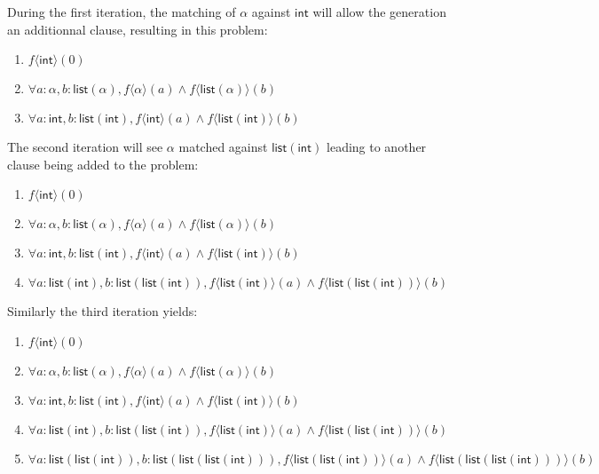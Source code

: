 \documentclass[]{ceurart}
\newcommand\ty[1]{\textsf{#1}}
\begin{document}
During the first iteration, the matching of \(\alpha\) against \(\ty{int}\) will allow the generation an additionnal clause, resulting in this problem:

\begin{enumerate}
   \item \(f\langle \ty{int}\rangle(0)\)
   \item \(\forall a: \alpha, b:\ty{list}(\alpha), f\langle\alpha\rangle(a) \land f\langle \ty{list}(\alpha)\rangle(b)\)
   \item \(\forall a: \ty{int}, b:\ty{list}(\ty{int}), f\langle\ty{int}\rangle(a) \land f\langle \ty{list}(\ty{int})\rangle(b)\)
\end{enumerate}

The second iteration will see \(\alpha\) matched against \(\ty{list}(\ty{int})\) leading to another clause being added to the problem:

\begin{enumerate}
   \item \(f\langle \ty{int}\rangle(0)\)
   \item \(\forall a: \alpha, b:\ty{list}(\alpha), f\langle\alpha\rangle(a) \land f\langle \ty{list}(\alpha)\rangle(b)\)
   \item \(\forall a: \ty{int}, b:\ty{list}(\ty{int}), f\langle\ty{int}\rangle(a) \land f\langle \ty{list}(\ty{int})\rangle(b)\)
   \item \(\forall a: \ty{list}(\ty{int}), b:\ty{list}(\ty{list}(\ty{int})), f\langle\ty{list}(\ty{int})\rangle(a) \land f\langle \ty{list}(\ty{list}(\ty{int}))\rangle(b)\)
\end{enumerate}

Similarly the third iteration yields:

\begin{enumerate}
   \item \(f\langle \ty{int}\rangle(0)\)
   \item \(\forall a: \alpha, b:\ty{list}(\alpha), f\langle\alpha\rangle(a) \land f\langle \ty{list}(\alpha)\rangle(b)\)
   \item \(\forall a: \ty{int}, b:\ty{list}(\ty{int}), f\langle\ty{int}\rangle(a) \land f\langle \ty{list}(\ty{int})\rangle(b)\)
   \item \(\forall a: \ty{list}(\ty{int}), b:\ty{list}(\ty{list}(\ty{int})), f\langle\ty{list}(\ty{int})\rangle(a) \land f\langle \ty{list}(\ty{list}(\ty{int}))\rangle(b)\)
   \item \(\forall a: \ty{list}(\ty{list}(\ty{int})), b:\ty{list}(\ty{list}(\ty{list}(\ty{int}))), f\langle\ty{list}(\ty{list}(\ty{int}))\rangle(a) \land f\langle \ty{list}(\ty{list}(\ty{list}(\ty{int})))\rangle(b)\)
\end{enumerate}
\end{document}
